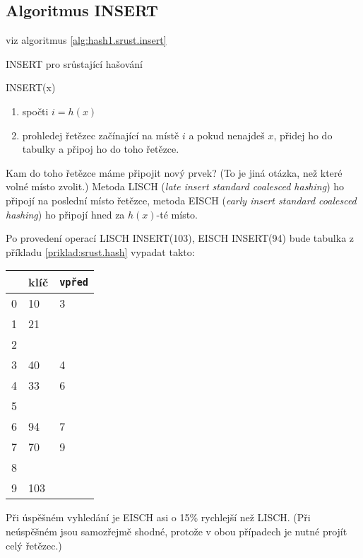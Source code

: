\vspace{5mm}

\subsection{Algoritmus INSERT}

viz algoritmus \ref{alg:hash1.srust.insert}

\begin{algorithm}[!htb]
\caption{INSERT pro srůstající hašování}
\label{alg:hash1.srust.insert}
INSERT(x)
\begin{enumerate}
\item
 spočti $i=h(x)$
\item
 prohledej řetězec začínající na místě $i$ a pokud nenajdeš $x$,
 přidej ho do tabulky a připoj ho do toho řetězce.
\end{enumerate}
\end{algorithm}

Kam do toho řetězce máme připojit nový prvek? (To je jiná otázka, než
které volné místo zvolit.) Metoda LISCH (\emph{late insert standard 
coalesced hashing}) ho připojí na poslední místo řetězce, 
metoda EISCH (\emph{early insert standard coalesced hashing}) 
ho připojí hned za $h(x)$-té místo.

\begin{priklad}
Po provedení operací
LISCH INSERT(103), EISCH INSERT(94) bude tabulka z příkladu
\ref{priklad:srust.hash} vypadat takto:

\vspace{5mm}

\begin{tabular}{|l|l|l|}
\hline
& klíč& {\tt vpřed}\\
\hline
0& 10& 3\\
1& 21& \\
2& & \\
3& 40& 4\\
4& 33& 6\\
5& & \\
6& 94& 7\\
7& 70& 9\\
8& & \\
9& 103& \\
\hline
\end{tabular}
\end{priklad}

\vspace{5mm}

\begin{pozn}
Při úspěšném vyhledání je EISCH asi o 15\% rychlejší než LISCH. (Při
neúspěšném jsou samozřejmě shodné, protože v obou případech je nutné 
projít celý řetězec.)
\end{pozn}

